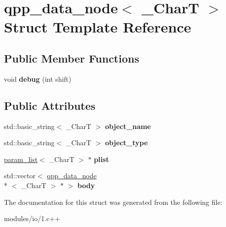 \hypertarget{structqpp__data__node}{\section{qpp\-\_\-data\-\_\-node$<$ \-\_\-\-Char\-T $>$ Struct Template Reference}
\label{structqpp__data__node}
}
\subsection*{Public Member Functions}
\begin{DoxyCompactItemize}
\item 
\hypertarget{structqpp__data__node_a542b7917f3ebf36e61c3c8e2bec1790a}{void {\bfseries debug} (int shift)}\label{structqpp__data__node_a542b7917f3ebf36e61c3c8e2bec1790a}

\end{DoxyCompactItemize}
\subsection*{Public Attributes}
\begin{DoxyCompactItemize}
\item 
\hypertarget{structqpp__data__node_a416d6a769ee8abb5b2707e653673e15d}{std\-::basic\-\_\-string$<$ \-\_\-\-Char\-T $>$ {\bfseries object\-\_\-name}}\label{structqpp__data__node_a416d6a769ee8abb5b2707e653673e15d}

\item 
\hypertarget{structqpp__data__node_a5916d127b13ac28e474aa9fa7dea2cd7}{std\-::basic\-\_\-string$<$ \-\_\-\-Char\-T $>$ {\bfseries object\-\_\-type}}\label{structqpp__data__node_a5916d127b13ac28e474aa9fa7dea2cd7}

\item 
\hypertarget{structqpp__data__node_ad6614e490a294dc84a911b5c56f84919}{\hyperlink{structparam__list}{param\-\_\-list}$<$ \-\_\-\-Char\-T $>$ $\ast$ {\bfseries plist}}\label{structqpp__data__node_ad6614e490a294dc84a911b5c56f84919}

\item 
\hypertarget{structqpp__data__node_a9ab043a177dd2f8ae0fa7327c9272297}{std\-::vector$<$ \hyperlink{structqpp__data__node}{qpp\-\_\-data\-\_\-node}\\*
$<$ \-\_\-\-Char\-T $>$ $\ast$ $>$ {\bfseries body}}\label{structqpp__data__node_a9ab043a177dd2f8ae0fa7327c9272297}

\end{DoxyCompactItemize}


The documentation for this struct was generated from the following file\-:\begin{DoxyCompactItemize}
\item 
modules/io/1.\-c++\end{DoxyCompactItemize}
